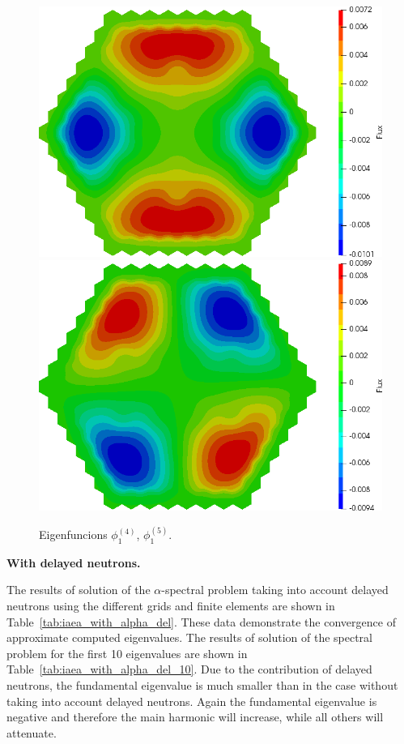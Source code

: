 \documentclass[authoryear]{elsarticle}
\begin{document}
\begin{figure}[h]
\begin{center}
	\includegraphics[width=0.49\linewidth]{iaea_with/alpha_sp3_u1_4.png}
	\includegraphics[width=0.49\linewidth]{iaea_with/alpha_sp3_u1_5.png}\\
	\caption{Eigenfuncions $\phi_1^{(4)}$, $\phi_1^{(5)}$.}
	\label{fig:iaea_with_fun_3}
\end{center}
\end{figure}

\textbf{With delayed neutrons.}

The results of solution of the $\alpha$-spectral problem taking into account delayed neutrons using the different grids and finite elements are shown in Table~\ref{tab:iaea_with_alpha_del}.
These data demonstrate the convergence of approximate computed eigenvalues.
The results of solution of the spectral problem for the first 10 eigenvalues are shown in Table~\ref{tab:iaea_with_alpha_del_10}.
Due to the contribution of delayed neutrons, the fundamental eigenvalue is much smaller than in the case without taking into account delayed neutrons.
Again the fundamental eigenvalue is negative and therefore the main harmonic will increase, while all others will attenuate.
\end{document}
